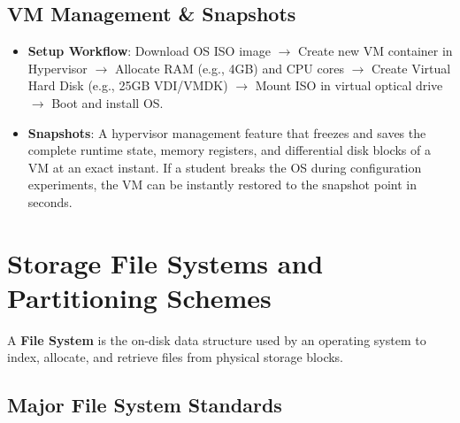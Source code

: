 \subsection{VM Management \& Snapshots}
\begin{itemize}
    \item \textbf{Setup Workflow}: Download OS ISO image $\rightarrow$ Create new VM container in Hypervisor $\rightarrow$ Allocate RAM (e.g., 4GB) and CPU cores $\rightarrow$ Create Virtual Hard Disk (e.g., 25GB VDI/VMDK) $\rightarrow$ Mount ISO in virtual optical drive $\rightarrow$ Boot and install OS.
    \item \textbf{Snapshots}: A hypervisor management feature that freezes and saves the complete runtime state, memory registers, and differential disk blocks of a VM at an exact instant. If a student breaks the OS during configuration experiments, the VM can be instantly restored to the snapshot point in seconds.
\end{itemize}

\section{Storage File Systems and Partitioning Schemes}

A \textbf{File System} is the on-disk data structure used by an operating system to index, allocate, and retrieve files from physical storage blocks.

\subsection{Major File System Standards}

